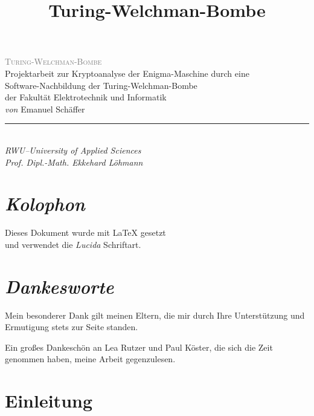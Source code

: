\documentclass[ngerman, a4paper, justified, nobib, notoc, sfsidenotes]{tufte-book}
\title{Turing-Welchman-Bombe}
\numberwithin{figure}{part}
\numberwithin{table}{part}
\numberwithin{equation}{part}
\numberwithin{mylisting}{part}
\begin{document}
	
	\begin{fullwidth}
		\begin{center}
			\garamondfont
			\thispagestyle{empty}
			\vspace*{3cm}
			{\huge\scshape\textcolor{gray}{Turing-Welchman-Bombe\\}}
			\vspace{5cm}
			\large
			Projektarbeit zur Kryptoanalyse der Enigma-Maschine durch eine\\ 
			Software-Nachbildung der Turing-Welchman-Bombe\\
			der Fakultät Elektrotechnik und Informatik\\
			\vspace{2cm}
			\textit{von} Emanuel Schäffer 
			\hspace{0.4cm} \textcolor{gray}{\rule[-.2em]{0.6pt}{1.2em}} \hspace{0.4cm} 
			\DTMtoday\\
			\vspace{2cm}
			\vfill
			\textsl{RWU--University of Applied Sciences\\Prof. Dipl.-Math. Ekkehard Löhmann}
			\normalsize
		\end{center}
	\end{fullwidth}
	
	\frontmatter
	\fontsize{8.5}{11.7}\selectfont

	\chapter*{\textit{Kolophon}}
	Dieses Dokument wurde mit \LaTeX{} gesetzt\\ und verwendet die \textsl{Lucida} Schriftart.
	
	\chapter*{\textit{Dankesworte}}
	Mein besonderer Dank gilt meinen Eltern, die mir durch Ihre Unterstützung und Ermutigung stets zur Seite standen.
	
	Ein großes Dankeschön an Lea Rutzer und Paul Köster, die sich die Zeit genommen haben, meine Arbeit gegenzulesen.
	
	\clearpage
	\tableofcontents
	
	\chapter*{Einleitung}\label{ch:einleitung}
\end{document}
